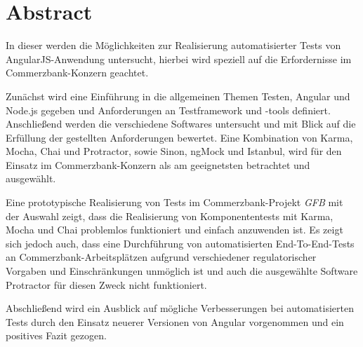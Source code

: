 \section*{Abstract}
In dieser \titleDocument{} werden die Möglichkeiten zur Realisierung automatisierter Tests von AngularJS-Anwendung untersucht, hierbei wird speziell auf die Erfordernisse im Commerzbank-Konzern geachtet.

Zunächst wird eine Einführung in die allgemeinen Themen Testen, Angular und Node.js gegeben und Anforderungen an Testframework und -tools definiert. Anschließend werden die verschiedene Softwares untersucht und mit Blick auf die Erfüllung der gestellten Anforderungen bewertet. Eine Kombination von Karma, Mocha, Chai und Protractor, sowie Sinon, ngMock und Istanbul, wird für den Einsatz im Commerzbank-Konzern als am geeignetsten betrachtet und ausgewählt.

Eine prototypische Realisierung von Tests im Commerzbank-Projekt \textit{GFB} mit der Auswahl zeigt, dass die Realisierung von Komponententests mit Karma, Mocha und Chai problemlos funktioniert und einfach anzuwenden ist. Es zeigt sich jedoch auch, dass eine Durchführung von automatisierten End-To-End-Tests an Commerzbank-Arbeitsplätzen aufgrund verschiedener regulatorischer Vorgaben und Einschränkungen unmöglich ist und auch die ausgewählte Software Protractor für diesen Zweck nicht funktioniert.

Abschließend wird ein Ausblick auf mögliche Verbesserungen bei automatisierten Tests durch den Einsatz neuerer Versionen von Angular vorgenommen und ein positives Fazit gezogen.